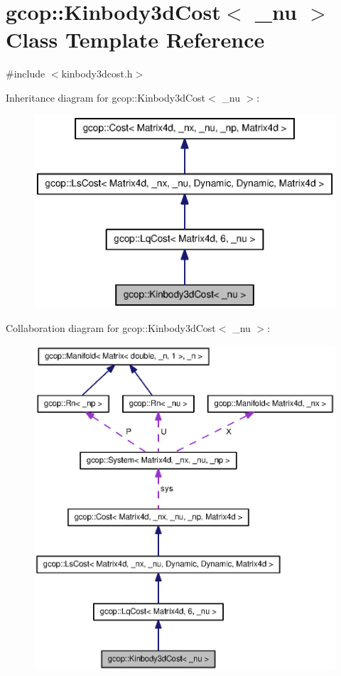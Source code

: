 \section{gcop\-:\-:\-Kinbody3d\-Cost$<$ \-\_\-nu $>$ \-Class \-Template \-Reference}
\label{classgcop_1_1Kinbody3dCost}


{\ttfamily \#include $<$kinbody3dcost.\-h$>$}



\-Inheritance diagram for gcop\-:\-:\-Kinbody3d\-Cost$<$ \-\_\-nu $>$\-:
\nopagebreak
\begin{figure}[H]
\begin{center}
\leavevmode
\includegraphics[width=350pt]{classgcop_1_1Kinbody3dCost__inherit__graph}
\end{center}
\end{figure}


\-Collaboration diagram for gcop\-:\-:\-Kinbody3d\-Cost$<$ \-\_\-nu $>$\-:
\nopagebreak
\begin{figure}[H]
\begin{center}
\leavevmode
\includegraphics[width=350pt]{classgcop_1_1Kinbody3dCost__coll__graph}
\end{center}
\end{figure}
